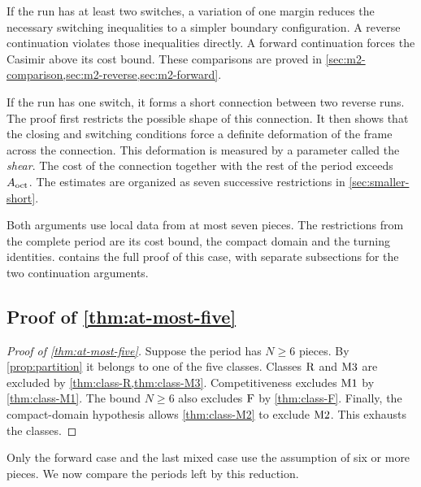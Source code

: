 If the run has at least two switches, a variation of one margin reduces the necessary switching
inequalities to a simpler boundary configuration. A reverse continuation violates those
inequalities directly. A forward continuation forces the Casimir above its cost bound. These
comparisons are proved in \cref{sec:m2-comparison,sec:m2-reverse,sec:m2-forward}.

If the run has one switch, it forms a short connection between two reverse runs. The proof first
restricts the possible shape of this connection. It then shows that the closing and switching
conditions force a definite deformation of the frame across the connection. This deformation is
measured by a parameter called the \emph{shear}. The cost of the connection together with the
rest of the period exceeds $A_{\mathrm{oct}}$. The estimates are organized as seven successive restrictions
in \cref{sec:smaller-short}.

Both arguments use local data from at most seven pieces. The restrictions from the complete period
are its cost bound, the compact domain and the turning identities.  contains the
full proof of this case, with separate subsections for the two continuation arguments.

\subsection{Proof of \texorpdfstring{\cref{thm:at-most-five}}{the bound on the number of pieces}}\label{sec:outline-five-proof}

\begin{proof}[Proof of \cref{thm:at-most-five}]
Suppose the period has $N\ge6$ pieces. By \cref{prop:partition} it belongs to one of the five
classes. Classes $\mathrm{R}$ and $\mathrm{M3}$ are excluded by
\cref{thm:class-R,thm:class-M3}. Competitiveness excludes $\mathrm{M1}$ by \cref{thm:class-M1}.
The bound $N\ge6$ also excludes $\mathrm{F}$ by \cref{thm:class-F}. Finally, the compact-domain
hypothesis allows \cref{thm:class-M2} to exclude $\mathrm{M2}$. This exhausts the classes.
\end{proof}

Only the forward case and the last mixed case use the assumption of six or more pieces. We now
compare the periods left by this reduction.
